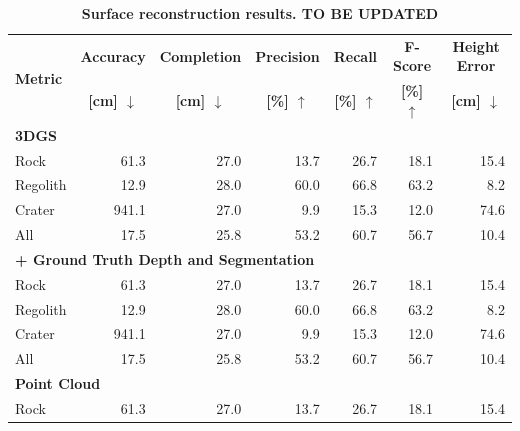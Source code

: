 \begin{table}[h]
	\centering
	\small
	\caption{\bfseries Surface reconstruction results. TO BE UPDATED}
	\label{tab:surface_reconstruction}
	\begin{tabular}[t]{|lrrrrrr|}
		\hline
		\multirow{2}{*}{\textbf{Metric}}               &
		\multicolumn{1}{c}{\textbf{Accuracy}}          &
		\multicolumn{1}{c}{\textbf{Completion}}        &
		\multicolumn{1}{c}{\textbf{Precision}}         &
		\multicolumn{1}{c}{\textbf{Recall}}            &
		\multicolumn{1}{c}{\textbf{F-Score}}           &
		\multicolumn{1}{c|}{\textbf{Height Error}}
		\\
		\multicolumn{1}{|c}{}                          &
		\multicolumn{1}{c}{\textbf{[cm] $\downarrow$}} &
		\multicolumn{1}{c}{\textbf{[cm] $\downarrow$}} &
		\multicolumn{1}{c}{\textbf{[\%] $\uparrow$}}   &
		\multicolumn{1}{c}{\textbf{[\%] $\uparrow$}}   &
		\multicolumn{1}{c}{\textbf{[\%] $\uparrow$}}   &
		\multicolumn{1}{c|}{\textbf{[cm] $\downarrow$}}
		\\
		\hline\hline
		\multicolumn{7}{|l|}{\textbf{3DGS}}                                                       \\
		Rock                                           & 61.3  & 27.0 & 13.7 & 26.7 & 18.1 & 15.4 \\
		Regolith                                       & 12.9  & 28.0 & 60.0 & 66.8 & 63.2 & 8.2  \\
		Crater                                         & 941.1 & 27.0 & 9.9  & 15.3 & 12.0 & 74.6 \\
		All                                            & 17.5  & 25.8 & 53.2 & 60.7 & 56.7 & 10.4 \\
		\multicolumn{7}{|l|}{\textbf{ + Ground Truth Depth and Segmentation}}                     \\
		Rock                                           & 61.3  & 27.0 & 13.7 & 26.7 & 18.1 & 15.4 \\
		Regolith                                       & 12.9  & 28.0 & 60.0 & 66.8 & 63.2 & 8.2  \\
		Crater                                         & 941.1 & 27.0 & 9.9  & 15.3 & 12.0 & 74.6 \\
		All                                            & 17.5  & 25.8 & 53.2 & 60.7 & 56.7 & 10.4 \\
		\hline
		\multicolumn{7}{|l|}{\textbf{Point Cloud}}                                                \\
		Rock                                           & 61.3  & 27.0 & 13.7 & 26.7 & 18.1 & 15.4 \\

\end{tabular}
\end{table}
